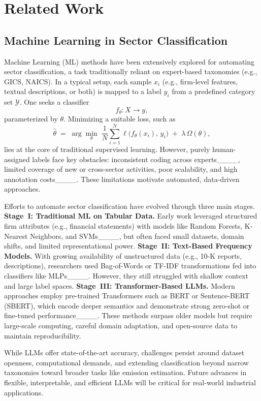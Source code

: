 \section{Related Work}
\subsection{Machine Learning in Sector Classification}
Machine Learning (ML) methods have been extensively explored for automating sector classification, a task traditionally reliant on expert-based taxonomies (e.g., GICS, NAICS). In a typical setup, each sample \(x_i\) (e.g., firm-level features, textual descriptions, or both) is mapped to a label \(y_i\) from a predefined category set \(\mathcal{Y}\). One seeks a classifier
\[
    f_{\theta}: X \to y,
\]
parameterized by \(\theta\). Minimizing a suitable loss, such as
\[
    \hat{\theta} \;=\; \arg\min_{\theta} \; \frac{1}{N}\sum_{i=1}^{N} \ell\bigl(f_{\theta}(x_i),\, y_i\bigr) \;+\; \lambda\,\Omega(\theta),
\]
lies at the core of traditional supervised learning. However, purely human-assigned labels face key obstacles: inconsistent coding across experts____, limited coverage of new or cross-sector activities, poor scalability, and high annotation costs____. These limitations motivate automated, data-driven approaches.

Efforts to automate sector classification have evolved through three main stages. \textbf{Stage~I: Traditional ML on Tabular Data.} Early work leveraged structured firm attributes (e.g., financial statements) with models like Random Forests, K-Nearest Neighbors, and SVMs____, but often faced small datasets, domain shifts, and limited representational power. \textbf{Stage~II: Text-Based Frequency Models.} With growing availability of unstructured data (e.g., 10-K reports, descriptions), researchers used Bag-of-Words or TF-IDF transformations fed into classifiers like MLPs____. However, they still struggled with shallow context and large label spaces. \textbf{Stage~III: Transformer-Based LLMs.} Modern approaches employ pre-trained Transformers such as BERT or Sentence-BERT (SBERT), which encode deeper semantics and demonstrate strong zero-shot or fine-tuned performance____. These methods surpass older models but require large-scale computing, careful domain adaptation, and open-source data to maintain reproducibility.

While LLMs offer state-of-the-art accuracy, challenges persist around dataset openness, computational demands, and extending classification beyond narrow taxonomies toward broader tasks like emission estimation. Future advances in flexible, interpretable, and efficient LLMs will be critical for real-world industrial applications.

